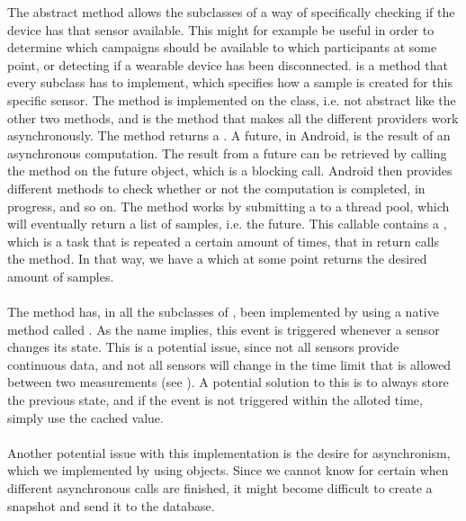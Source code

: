 The abstract  method allows the subclasses of  a way of specifically checking if the device has that sensor available. This might for example be useful in order to determine which campaigns should be available to which participants at some point, or detecting if a wearable device has been disconnected.  is a method that every subclass has to implement, which specifies how a sample is created for this specific sensor. The  method is implemented on the  class, i.e. not abstract like the other two methods, and is the method that makes all the different providers work asynchronously. The method returns a . A future, in Android, is the result of an asynchronous computation. The result from a future can be retrieved by calling the  method on the future object, which is a blocking call. Android then provides different methods to check whether or not the computation is completed, in progress, and so on. The method works by submitting a  to a thread pool, which will eventually return a list of samples, i.e. the future. This callable contains a , which is a task that is repeated a certain amount of times, that in return calls the  method. In that way, we have a  which at some point returns the desired amount of samples. 
\\\\
The  method has, in all the subclasses of , been implemented by using a native method called . As the name implies, this event is triggered whenever a sensor changes its state. This is a potential issue, since not all sensors provide continuous data, and not all sensors will change in the time limit that is allowed between two measurements (see ). A potential solution to this is to always store the previous state, and if the event is not triggered within the alloted time, simply use the cached value. 
\\\\
Another potential issue with this implementation is the desire for asynchronism, which we implemented by using  objects. Since we cannot know for certain when different asynchronous calls are finished, it might become difficult to create a snapshot and send it to the database.

% 